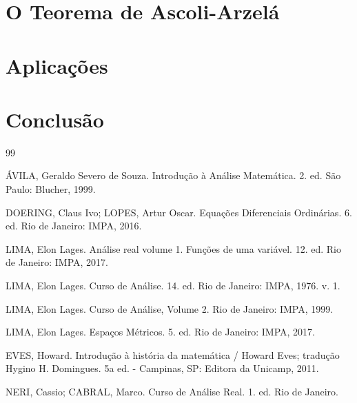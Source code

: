 \documentclass[a4paper,12pt]{report}
\begin{document}
	
	
	
	
	\newpage
	
	
	\chapter{O Teorema de Ascoli-Arzelá}
	
	
	\newpage
	
	
	\chapter{Aplicações}
	
	
	
	\newpage
	
	
	\chapter*{Conclusão}
	
	
	
	
	\newpage
	
	
	\begin{thebibliography}{99}
		
		 ÁVILA, Geraldo Severo de Souza. Introdução à Análise Matemática. 2. ed. São Paulo: Blucher, 1999.
		
		 DOERING, Claus Ivo; LOPES, Artur Oscar. Equações Diferenciais Ordinárias. 6. ed. Rio de Janeiro: IMPA, 2016. 
		
		 LIMA, Elon Lages. Análise real volume 1. Funções de uma variável. 12. ed. Rio de Janeiro: IMPA, 2017.
		
		 LIMA, Elon Lages. Curso de Análise. 14. ed. Rio de Janeiro: IMPA, 1976. v. 1. 
		
		 LIMA, Elon Lages. Curso de Análise, Volume 2. Rio de Janeiro: IMPA, 1999.
		
		 LIMA, Elon Lages. Espaços Métricos. 5. ed. Rio de Janeiro: IMPA, 2017.
		
		 EVES, Howard. Introdução à história da matemática / Howard Eves; tradução Hygino H. Domingues. 5a ed. - Campinas, SP: Editora da Unicamp, 2011.
		
		 NERI, Cassio; CABRAL, Marco. Curso de Análise Real. 1. ed. Rio de Janeiro.
		
		
		
	\end{thebibliography}
	
	
	\newpage
	
	
	
	
	
\end{document}
